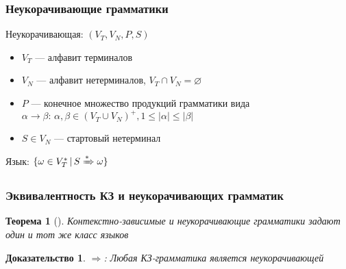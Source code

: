 \documentclass{beamer}
\newtheorem{rutheorem}{Теорема}
\newtheorem{ruproof}{Доказательство}
\newcommand{\derive}[0]{\xRightarrow[]{*}}
\begin{document}
\begin{frame}[fragile]
  \transwipe[direction=90]
  \frametitle{Неукорачивающие грамматики}

\begin{center}
    Неукорачивающая: $(V_T, V_N, P, S)$
\end{center}

  \begin{itemize}
    \item $V_T$ --- алфавит терминалов
    \item $V_N$ --- алфавит нетерминалов, $V_T \cap V_N = \varnothing$
    \item $P$ --- конечное множество продукций грамматики вида $\alpha \rightarrow \beta: \, \alpha, \beta \in (V_T \cup V_N)^+, 1 \leq |\alpha| \leq |\beta|$
    \item $S \in V_N$ --- стартовый нетерминал
  \end{itemize}


\begin{center}
    Язык: $\{ \omega \in V_T^* \, | \, S \derive \omega\}$
\end{center}
\end{frame}


\begin{frame}[fragile]
  \transwipe[direction=90]
  \frametitle{Эквивалентность КЗ и неукорачивающих грамматик}
\begin{rutheorem}[]
  Контекстно-зависимые и неукорачивающие грамматики задают один и тот же класс языков
\end{rutheorem}

\begin{ruproof}
$\Rightarrow$: Любая КЗ-грамматика является неукорачивающей
\end{ruproof}

\end{frame}
\end{document}
